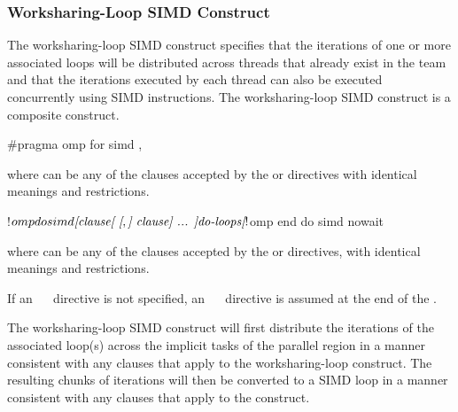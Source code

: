 \begin{samepage}
\subsubsection{Worksharing-Loop SIMD Construct}
\label{subsubsec:Worksharing-Loop SIMD Construct}
\summary
The worksharing-loop SIMD construct specifies that the iterations of one or
more associated loops will be distributed across threads that already exist in
the team and that the iterations executed by each thread can also be executed
concurrently using SIMD instructions. The worksharing-loop SIMD construct is a composite construct.
\end{samepage}

\begin{samepage}
\syntax
\begin{ccppspecific}
\begin{ompcPragma}
#pragma omp for simd \plc{[clause[ [},\plc{] clause] ... ] new-line}
\end{ompcPragma}

where  can be any of the clauses accepted by the  or  directives with
identical meanings and restrictions.
\end{ccppspecific}
\end{samepage}

\begin{fortranspecific}
\begin{ompfPragma}
!$omp do simd \plc{[clause[ [},\plc{] clause] ... ]}
   \plc{do-loops}
\plc{[}!$omp end do simd \plc{[}nowait\plc{] ]}
\end{ompfPragma}

where  can be any of the clauses accepted by the  or  directives, with
identical meanings and restrictions.

If an ~~ directive is not specified, an ~~ directive is
assumed at the end of the .
\end{fortranspecific}

\descr
The worksharing-loop SIMD construct will first distribute the iterations of the associated loop(s)
across the implicit tasks of the parallel region in a manner consistent with any clauses
that apply to the worksharing-loop construct. The resulting chunks of iterations will then be converted
to a SIMD loop in a manner consistent with any clauses that apply to the 
construct.

